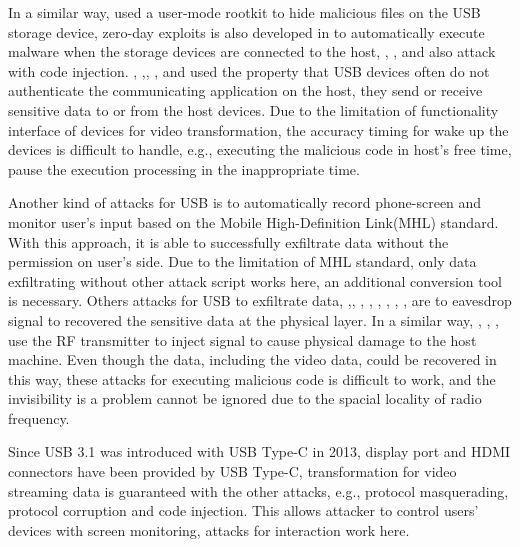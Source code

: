 In a similar way, \cite{duqu} used a user-mode rootkit to hide malicious files on the USB storage device, zero-day exploits is also developed in \cite{zero-day} to automatically execute malware when the storage devices are connected to the host, \cite{brain}, \cite{stuxnet}, \cite{conficker} and \cite{flame} also attack with code injection. \cite{webcam}, \cite{malware},\cite{audioextraction}, \cite{usbee}, and \cite{turnip} used the property that USB devices often do not authenticate the communicating application on the host, they send or receive sensitive data to or from the host devices. Due to the limitation of functionality interface of devices for video transformation, the accuracy timing for wake up the devices is difficult to handle, e.g., executing the malicious code in host's free time, pause the execution processing in the inappropriate time. 

Another kind of attacks for USB \cite{JFC} is to automatically record phone-screen and monitor user's input based on  the Mobile High-Definition Link(MHL) standard. With this approach, it is able to successfully exfiltrate data without the permission on user's side. Due to the limitation of MHL standard, only data exfiltrating without other attack script works here, an additional conversion tool is necessary. Others attacks for USB to exfiltrate data\cite{smartphone}, \cite{poweremi},\cite{revealing}, \cite{su2017usb}, \cite{usbgpslocator}, \cite{bates2014leveraging}, \cite{badusbhub}, \cite{usbfinger}, \cite{side}, \cite{usbdriver} are to eavesdrop signal to recovered the sensitive data at the physical layer. In a similar way, \cite{usbkiller}, \cite{cable}, \cite{usbee}, \cite{turnip} use the RF transmitter to inject signal to cause physical damage to the host machine. Even though the data, including the video data, could be recovered in this way, these attacks for executing malicious code is difficult to work, and the invisibility is a problem cannot be ignored due to the spacial locality of radio frequency. 


Since USB 3.1 was introduced with USB Type-C in 2013, display port and HDMI connectors have been provided by USB Type-C, transformation for video streaming data is guaranteed with the other attacks, e.g., protocol masquerading,  protocol corruption and code injection. This allows attacker to control users' devices with screen monitoring, attacks for interaction work here.



\\

